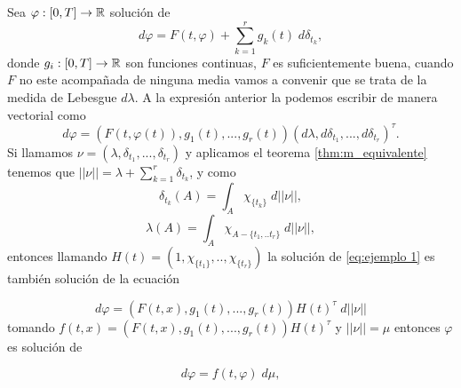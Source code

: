  \begin{example}
 	Sea $\varphi:[0,T]\to\mathbb{R}$ solución de  
 	\begin{equation}
 		d\varphi=F(t,\varphi)+\sum_{k=1}^rg_k(t)\;d\delta_{t_k},\label{eq:ejemplo 1}
 	\end{equation}
  donde $g_i:[0,T]\to \mathbb{R}$ son funciones continuas, $F$ es suficientemente buena, cuando $F$ no este acompañada de ninguna media  vamos a convenir que se trata de la medida de Lebesgue $d\lambda$. A la expresión anterior la podemos escribir de manera vectorial como 
 	\begin{equation*}
	d\varphi=\left( F(t,\varphi(t)),g_1(t),...,g_r(t)\right)  \left( d\lambda, d\delta_{t_1},...,d\delta_{t_r}\right)^\tau. 
\end{equation*} 
 Si llamamos $\nu=(\lambda,\delta_{t_1},...,\delta_{t_r})$ y aplicamos el teorema \eqref{thm:m_equivalente} tenemos que  $||\nu||=\displaystyle\lambda+\sum_{k=1}^r\delta_{t_k}$, y como
$$\delta_{t_k}(A)=\int_A  \chi_{\{t_k\}}\; d||\nu||,$$
$$\lambda(A)=\int_A \chi_{A-\{t_1,..t_r\}}\; d||\nu||,$$
entonces llamando $H(t)=(1,\chi_{\{t_1\}},..,\chi_{\{t_r\}})$  la solución de \eqref{eq:ejemplo 1} es también solución de la ecuación 

 	\begin{equation*}
	d\varphi=\left(F(t,x),g_1(t),...,g_r(t)\right)H(t)^\tau \; d||\nu||
\end{equation*} 
 tomando $f(t,x)=(F(t,x),g_1(t),...,g_r(t))H(t)^\tau$ y $||\nu||=\mu$ entonces  $\varphi$ es solución de


 	\begin{equation*}
	d\varphi=f(t,\varphi)\; d\mu,
\end{equation*} 
 \end{example}
 
